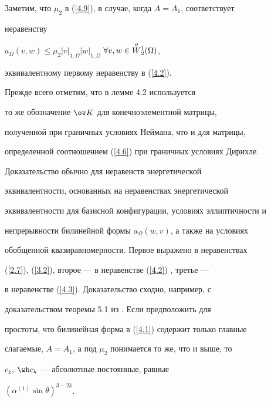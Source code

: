 Заметим, что $\mu_2$ в (\ref{4.9}), в случае, когда $A=A_1$, соответствует


неравенству


$a_\Omega(v,w)\le\mu_2|v|_{1,\Omega}|w|_{1,\Omega}$ $\forall v,w


\in\oW_2^1(\Omega)$,


эквивалентному первому неравенству в (\ref{4.2}).





\begin{pf} Прежде всего отметим, что в лемме 4.2 используется 


то же обозначение $\ov K$ для конечноэлементной матрицы,


полученной при граничных условиях Неймана, что и для матрицы,


определенной соотношением (\ref{4.6}) при граничных условиях Дирихле.


Доказательство обычно для неравенств энергетической


эквивалентности, основанных на неравенствах энергетической


эквивалентности для базисной конфигурации, условиях эллиптичности и


непрерывности билинейной формы $a_\Omega(w,v)$, а также на условиях


обобщенной квазиравномерности. Первое выражено в неравенствах


(\ref{2.7}), (\ref{3.2}), второе --- в неравенстве (\ref{4.2}) , третье ---


в неравенстве (\ref{4.3}). Доказательство сходно, например, с


доказательством теоремы 5.1 из \cite{iva-kor1}. Если предположить для


простоты, что билинейная форма в (\ref{4.1}) содержит только главные


слагаемые, $A=A_1$, а под $\mu_2$ понимается то же, что и выше, то


$c_k$, $\wh c_k$ --- абсолютные постоянные, равные


$(\alpha ^{(1)} \sin \theta)^{3-2k}$.


\end{pf}











\vskip 2cm









\smallskip









\label{end}





